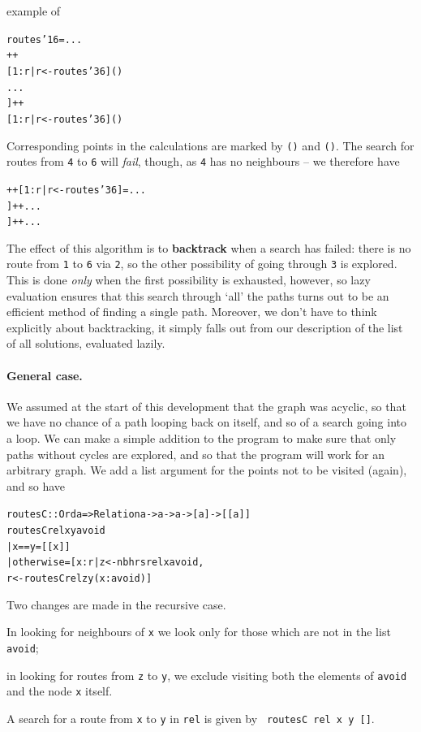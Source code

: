 \begin{example}
example of
\begin{alltt}
routes' 1 6 = ...
\step [ 1:r | r <- routes' 2 6 ] ++ 
    [ 1:r | r <- routes' 3 6 ]\hfill (\dag)
\step ...
\step [ 1:r | r <- [ 2:s | s <- routes' 4 6 ] ] ++ 
    [ 1:r | r <- routes' 3 6 ]\hfill (\ddag)
\end{alltt}
Corresponding points in the calculations are marked by \texttt{(\dag)} and
\texttt{(\ddag)}. The search for routes from \texttt{4} to \texttt{6} will {\em fail\/},
though, as \texttt{4} has no neighbours -- we therefore have
\begin{alltt}
\step [] ++ [ 1:r | r <- routes' 3 6 ] = ...
\step [ 1:r | r <- [ 3:s | s <- routes' 5 6 ] ] ++ ...
\step [[1,3,5,6]] ++ ...
\end{alltt}
The effect of this algorithm is to \textbf{backtrack} 
when a search has
failed: there is no route from \texttt{1} to \texttt{6} via \texttt{2}, so the other
possibility of going through \texttt{3} is explored. This is done  {\em only\/}
when the first possibility is exhausted, however, so lazy evaluation ensures
that this search through `all' the paths turns out to be an efficient method
of finding a single path. Moreover, we don't have to think explicitly about backtracking, it simply falls out from our description of the list of all solutions, evaluated lazily.


\paragraph{General case.}

We assumed at the start of this development that the graph was acyclic, so
that we have no chance of a path looping back on itself, and so of a search
going into a loop. We can make a simple addition to the program to make sure
that only paths without cycles are explored, and so that the program will
work for an arbitrary graph. We add a list argument for the points not to be
visited (again), and so have
\begin{alltt}
routesC :: Ord a => Relation a -> a -> a -> [a] -> [[a]]
routesC rel x y avoid
  | x==y        = [[x]]
  | otherwise   = [ x:r | z <- nbhrs rel x \bs{}\bs{} avoid ,
                          r <- routesC rel z y (x:avoid) ]
\end{alltt}
Two changes are made in the recursive case.
\begin{titemize}
\item In looking for neighbours of \texttt{x} we look only for those which are
not in the list \texttt{avoid};
\item in looking for routes from \texttt{z} to \texttt{y}, we exclude visiting both
the elements of \texttt{avoid} and the node \texttt{x} itself. 
\end{titemize}
A search for a route from \texttt{x} to \texttt{y} in \texttt{rel} is given by \texttt{
routesC rel x y []}.
\end{example}

